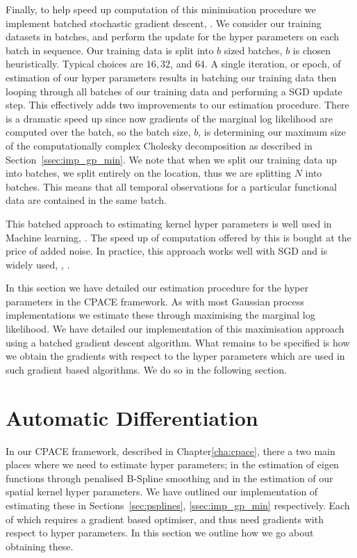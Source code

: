 Finally, to help speed up computation of this minimisation procedure we implement batched stochastic gradient descent, \citep{li_efficient_2014}.
We consider our training datasets in batches, and perform the update for the hyper parameters on each batch in sequence.
Our training data is split into $b$ sized batches, $b$ is chosen heuristically.
Typical choices are $16, 32$, and $64$.
A single iteration, or epoch, of estimation of our hyper parameters results in batching our training data then looping through all batches of our training data and performing a SGD update step.
This effectively adds two improvements to our estimation procedure.
There is a dramatic speed up since now gradients of the marginal log likelihood are computed over the batch, so the batch size, $b$, is determining our maximum size of the computationally complex Cholesky decomposition as described in Section~\ref{ssec:imp_gp_min}.
We note that when we split our training data up into batches, we split entirely on the location, thus we are splitting $N$ into batches.
This means that all temporal observations for a particular functional data are contained in the same batch.

This batched approach to estimating kernel hyper parameters is well used in Machine learning, \citep{li_efficient_2014}. 
The speed up of computation offered by this is bought at the price of added noise.
In practice, this approach works well with SGD and is widely used, \citep{li_efficient_2014}, \citep{sra_optimization_2012}.

In this section we have detailed our estimation procedure for the hyper parameters in the CPACE framework.
As with most Gaussian process implementations we estimate these through maximising the marginal log likelihood.
We have detailed our implementation of this maximisation approach using a batched gradient descent algorithm. 
What remains to be specified is how we obtain the gradients with respect to the hyper parameters which are used in such gradient based algorithms.
We do so in the following section.

\section{Automatic Differentiation \label{sec:auto_diff}}
In our CPACE framework, described in Chapter\ref{cha:cpace}, there a two main places where we need to estimate hyper parameters;
in the estimation of eigen functions through penalised B-Spline smoothing and in the estimation of our spatial kernel hyper parameters.
We have outlined our implementation of estimating these in Sections~\ref{sec:psplines}, \ref{ssec:imp_gp_min} respectively.
Each of which requires a gradient based optimiser, and thus need gradients with respect to hyper parameters.
In this section we outline how we go about obtaining these.


